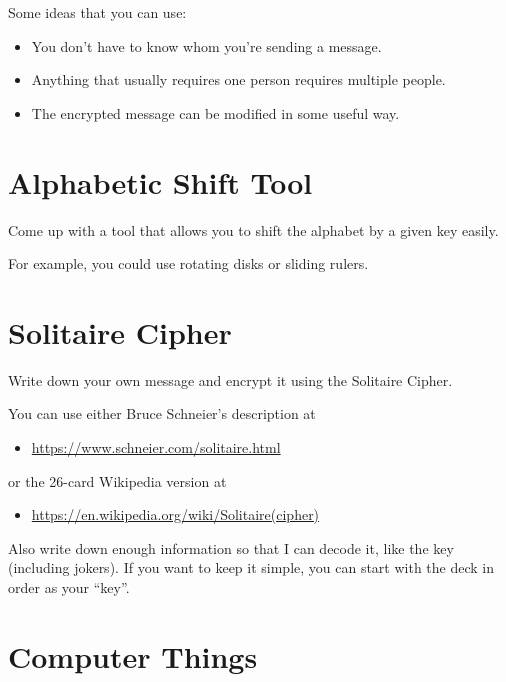 \documentclass[12pt]{article}
\begin{document}
Some ideas that you can use:

\begin{itemize}
\item You don't have to know whom you're sending a message.
\item Anything that usually requires one person requires multiple people.
\item The encrypted message can be modified in some useful way.
\end{itemize}


\section{Alphabetic Shift Tool}

Come up with a tool that allows you to shift the alphabet by a given key easily.

For example, you could use rotating disks or sliding rulers.

\section{Solitaire Cipher}

Write down your own message and encrypt it using the Solitaire Cipher.


\vspace{2em}

You can use either Bruce Schneier's description at
\begin{itemize}
\item \href{https://www.schneier.com/solitaire.html}{https://www.schneier.com/solitaire.html}
\end{itemize}

or the 26-card Wikipedia version at 

\begin{itemize}
\item \href{https://en.wikipedia.org/wiki/Solitaire_(cipher)}{https://en.wikipedia.org/wiki/Solitaire\textunderscore(cipher)}
\end{itemize}

Also write down enough information so that I can decode it, like the key (including jokers).
If you want to keep it simple, you can start with the deck in order as your ``key''.


\newpage
\section*{Computer Things}
\end{document}
